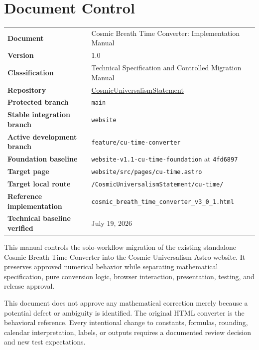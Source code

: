\documentclass[11pt,letterpaper]{article}
\newcommand{\ProjectTitle}{Cosmic Breath Time Converter}
\newcommand{\DocumentTitle}{Implementation Manual}
\newcommand{\RepositoryName}{CosmicUniversalismStatement}
\newcommand{\RepositoryURL}{https://github.com/willmaddock/CosmicUniversalismStatement}
\newcommand{\StableBranch}{website}
\newcommand{\WebsiteBranch}{feature/cu-time-converter}
\newcommand{\TargetRoute}{/CosmicUniversalismStatement/cu-time/}
\newcommand{\BaselineTag}{website-v1.1-cu-time-foundation}
\newcommand{\BaselineCommit}{4fd6897}
\newcommand{\DocumentVersion}{1.0}
\newcommand{\VerificationDate}{July 19, 2026}
\newcommand{\filepath}[1]{\texttt{#1}}
\newcommand{\branchname}[1]{\texttt{#1}}
\begin{document}
\pagecolor{white}
\color{CUText}

\section*{Document Control}

\begin{tabularx}{\textwidth}{>{\bfseries}L{1.88in}Y}
\toprule
Document & \ProjectTitle: \DocumentTitle \\
Version & \DocumentVersion \\
Classification & Technical Specification and Controlled Migration Manual \\
Repository & \href{\RepositoryURL}{\RepositoryName} \\
Protected branch & \branchname{main} \\
Stable integration branch & \branchname{\StableBranch} \\
Active development branch & \branchname{\WebsiteBranch} \\
Foundation baseline & \branchname{\BaselineTag} at \texttt{\BaselineCommit} \\
Target page & \filepath{website/src/pages/cu-time.astro} \\
Target local route & \texttt{\TargetRoute} \\
Reference implementation & \filepath{cosmic\_breath\_time\_converter\_v3\_0\_1.html} \\
Technical baseline verified & \VerificationDate \\
\bottomrule
\end{tabularx}

\begin{purposebox}
This manual controls the solo-workflow migration of the existing standalone
Cosmic Breath Time Converter into the Cosmic Universalism Astro website.
It preserves approved numerical behavior while separating mathematical
specification, pure conversion logic, browser interaction, presentation,
testing, and release approval.
\end{purposebox}

\begin{safetybox}
This document does not approve any mathematical correction merely because a
potential defect or ambiguity is identified. The original HTML converter is
the behavioral reference. Every intentional change to constants, formulas,
rounding, calendar interpretation, labels, or outputs requires a documented
review decision and new test expectations.
\end{safetybox}
\end{document}
